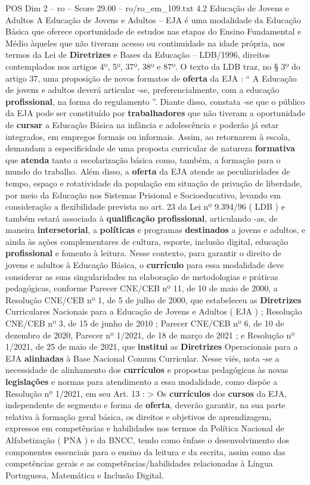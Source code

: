 \begin{textsample}{POS Dim 2 – ro – Score 29.00 – ro/ro\_em\_109.txt}  \label{ex:f2_pos_185}
4.2 Educação de Jovens e Adultos A Educação de Jovens e Adultos – EJA é uma modalidade da Educação Básica que oferece oportunidade de estudos nas etapas do Ensino Fundamental e Médio àqueles que não tiveram acesso ou continuidade na idade própria, nos termos da Lei de \textbf{Diretrizes} e Bases da Educação – LDB/1996, direitos contemplados nos artigos 4º, 5º, 37º, 38º e 87º.
O texto da LDB traz, no § 3º do artigo 37, uma proposição de novos formatos de \textbf{oferta} da EJA : “ A Educação de jovens e adultos deverá articular -se, preferencialmente, com a educação \textbf{profissional}, na forma do regulamento ”.
Diante disso, constata -se que o público da EJA pode ser constituído por \textbf{trabalhadores} que não tiveram a oportunidade de \textbf{cursar} a Educação Básica na infância e adolescência e poderão já estar integrados, em empregos formais ou informais.
Assim, ao retornarem à escola, demandam a especificidade de uma proposta curricular de natureza \textbf{formativa} que \textbf{atenda} tanto a escolarização básica como, também, a formação para o mundo do trabalho.
Além disso, a \textbf{oferta} da EJA atende as peculiaridades de tempo, espaço e rotatividade da população em situação de privação de liberdade, por meio da Educação nos Sistemas Prisional e Socioeducativo, levando em consideração a flexibilidade prevista no art. 23 da Lei nº 9.394/96 ( LDB ) e também estará associada à \textbf{qualificação} \textbf{profissional}, articulando -as, de maneira \textbf{intersetorial}, a \textbf{políticas} e programas \textbf{destinados} a jovens e adultos, e ainda às ações complementares de cultura, esporte, inclusão digital, educação \textbf{profissional} e fomento à leitura.
Nesse contexto, para garantir o direito de jovens e adultos à Educação Básica, o \textbf{currículo} para essa modalidade deve considerar as suas singularidades na elaboração de metodologias e práticas pedagógicas, conforme Parecer CNE/CEB nº 11, de 10 de maio de 2000, a Resolução CNE/CEB nº 1, de 5 de julho de 2000, que estabeleceu as \textbf{Diretrizes} Curriculares Nacionais para a Educação de Jovens e Adultos ( EJA ) ; Resolução CNE/CEB nº 3, de 15 de junho de 2010 ; Parecer CNE/CEB nº 6, de 10 de dezembro de 2020, Parecer nº 1/2021, de 18 de março de 2021 ; e Resolução nº 1/2021, de 25 de maio de 2021, que \textbf{institui} as \textbf{Diretrizes} Operacionais para a EJA \textbf{alinhadas} à Base Nacional Comum Curricular.
Nesse viés, nota -se a necessidade de alinhamento dos \textbf{currículos} e propostas pedagógicas às novas \textbf{legislações} e normas para atendimento a essa modalidade, como dispõe a Resolução nº 1/2021, em seu Art. 13 : > Os \textbf{currículos} dos \textbf{cursos} da EJA, independente de segmento e forma de \textbf{oferta}, deverão garantir, na sua parte relativa à formação geral básica, os direitos e objetivos de aprendizagem, expressos em competências e habilidades nos termos da Política Nacional de Alfabetização ( PNA ) e da BNCC, tendo como ênfase o desenvolvimento dos componentes essenciais para o ensino da leitura e da escrita, assim como das competências gerais e as competências/habilidades relacionadas à Língua Portuguesa, Matemática e Inclusão Digital.

\end{textsample}
